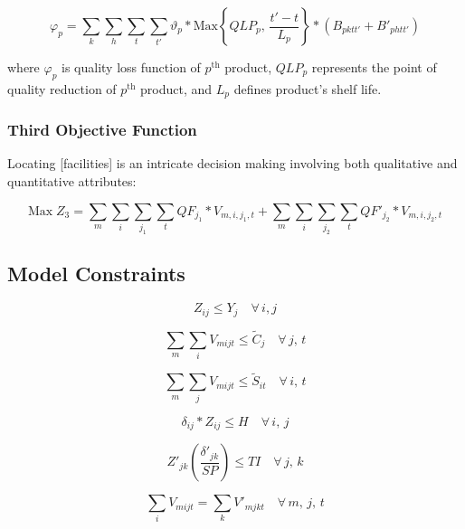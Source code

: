 \documentclass[10pt,twocolumn]{article}
\begin{document}
\begin{equation}
\varphi_p = \sum_k \sum_h \sum_t \sum_{t'}
  \vartheta_p * \text{Max}\!\left\{QLP_p,\,
  \frac{t'-t}{L_p}\right\}
  * \left(B_{pktt'} + B'_{phtt'}\right)
\label{eq:phi}
\end{equation}

where $\varphi_p$ is quality loss function of $p^{\text{th}}$
product, $QLP_p$ represents the point of quality reduction of
$p^{\text{th}}$ product, and $L_p$ defines product's shelf life.

\subsubsection{Third Objective Function}
Locating [facilities] is an intricate decision making involving
both qualitative and quantitative attributes:

\begin{equation}
\text{Max}\; Z_3 = \sum_{m}\sum_{i}\sum_{j_1}\sum_{t}
  QF_{j_1} * V_{m,i,j_1,t}
  + \sum_{m}\sum_{i}\sum_{j_2}\sum_{t}
  QF'_{j_2} * V_{m,i,j_2,t}
\label{eq:z3}
\end{equation}

\subsection{Model Constraints}

\begin{equation}
Z_{ij} \le Y_j \quad \forall\, i, j
\label{eq:c1}
\end{equation}

\begin{equation}
\sum_m \sum_i V_{mijt} \le \tilde{C}_j \quad \forall\, j,\, t
\label{eq:c2}
\end{equation}

\begin{equation}
\sum_m \sum_j V_{mijt} \le \tilde{S}_{it} \quad \forall\, i,\, t
\label{eq:c3}
\end{equation}

\begin{equation}
\delta_{ij} * Z_{ij} \le H \quad \forall\, i,\, j
\label{eq:c4}
\end{equation}

\begin{equation}
Z'_{jk}\!\left(\frac{\delta'_{jk}}{SP}\right) \le TI
  \quad \forall\, j,\, k
\label{eq:c5}
\end{equation}

\begin{equation}
\sum_i V_{mijt} = \sum_k V'_{mjkt} \quad \forall\, m,\, j,\, t
\label{eq:c6}
\end{equation}
\end{document}
